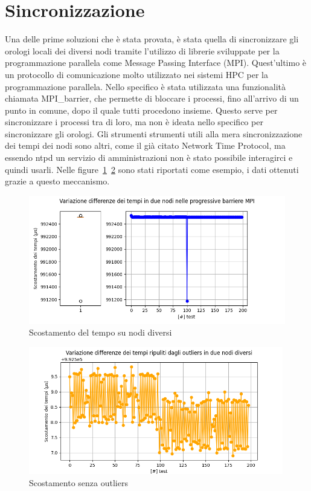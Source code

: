 \section{Sincronizzazione}\label{sec:timesync}
Una delle prime soluzioni che è stata provata, è stata quella di sincronizzare gli orologi locali dei diversi nodi tramite l'utilizzo di librerie sviluppate per la programmazione parallela come Message Passing Interface (MPI). Quest'ultimo è un protocollo di comunicazione molto utilizzato nei sistemi HPC per la programmazione parallela.
Nello specifico è stata utilizzata una funzionalità chiamata MPI\_barrier, che permette di bloccare i processi, fino all'arrivo di un punto in comune, dopo il quale tutti procedono insieme. Questo serve per sincronizzare i processi tra di loro, ma non è ideata nello specifico per sincronizzare gli orologi. Gli strumenti strumenti utili alla mera sincronizzazione dei tempi dei nodi sono altri, come il già citato Network Time Protocol,
ma essendo ntpd un servizio di amministrazioni non è stato possibile interagirci e quindi usarli. Nelle figure~\ref{fig:sync_time_shift1}~\ref{fig:sync_time_shift2} sono stati riportati come esempio, i dati ottenuti grazie a questo meccanismo.

\begin{figure}[H]
    \centering
    \includegraphics[width=\textwidth]{./results/time_sync_node.png}
    \caption{Scostamento del tempo su nodi diversi}\label{fig:sync_time_shift1}
\end{figure}
\begin{figure}[H]
    \includegraphics[width=0.99\textwidth]{./results/time_shift_clean.png}
    \caption{Scostamento senza outliers}\label{fig:sync_time_shift2}
\end{figure}

